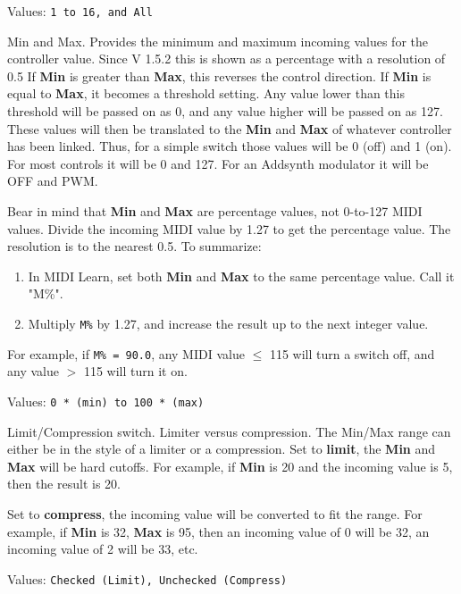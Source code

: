    Values: \texttt{1 to 16, and All}

   Min and Max.
   Provides the minimum and maximum incoming values for the controller value.
   Since V 1.5.2 this is shown as a percentage with a resolution of 0.5
   If \textbf{Min} is greater than \textbf{Max}, this reverses the control
   direction.
   If \textbf{Min} is equal to \textbf{Max}, it becomes a threshold setting.
   Any value lower than this threshold will be passed on as 0, and any
   value higher will be passed on as 127.
   These values will then be translated to the 
   \textbf{Min} and \textbf{Max} of whatever
   controller has been linked. Thus, for a simple switch those values
   will be 0 (off) and 1 (on). For most controls it will be 0 and 127.
   For an Addsynth modulator it will be OFF and PWM.

   Bear in mind that \textbf{Min} and \textbf{Max} are percentage values, not
   0-to-127 MIDI values.  Divide the incoming MIDI value by 1.27 to get the
   percentage value.  The resolution is to the nearest 0.5.
   To summarize:

   \begin{enumerate}
      \item In MIDI Learn, set both \textbf{Min} and \textbf{Max} to the same
         percentage value.  Call it "M\%".
      \item Multiply \texttt{M\%} by 1.27, and increase the result up to the
         next integer value.
   \end{enumerate}

   For example, if \texttt{M\% = 90.0}, any MIDI value $\leq$ 115 will turn a
   switch off, and any value $>$ 115 will turn it on.

   Values: \texttt{0 * (min) to 100 * (max)}

   Limit/Compression switch.
   Limiter versus compression.
   The Min/Max range can either be in the style of a limiter or a compression.
   Set to \textbf{limit}, the \textbf{Min} and \textbf{Max} will be hard cutoffs.
   For example, if \textbf{Min} is 20 and the incoming value is 5, then the
   result is 20.

   Set to \textbf{compress}, the incoming value will be converted to fit
   the range. For example, if \textbf{Min} is 32, \textbf{Max} is 95, then
   an incoming value of 0 will be 32, an incoming value of 2
   will be 33, etc.

   Values: \texttt{Checked (Limit), Unchecked (Compress)}

